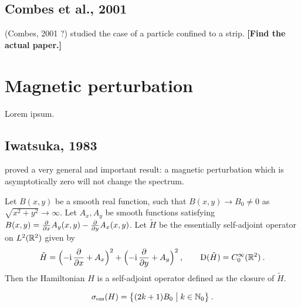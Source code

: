 \subsection{Combes et al., 2001}
(Combes, 2001 ?) studied the case of a particle confined to a strip.
\textbf{[Find the actual paper.]}

\section{Magnetic perturbation}
\label{section-known-magnetic}
Lorem ipsum.

\subsection{Iwatsuka, 1983}
\cite{Iwatsuka1983} proved a very general and important result: a magnetic perturbation which is asymptotically zero will not change the spectrum.
\begin{defn}
    Let $B(x, y)$ be a smooth real function, such that $B(x, y) \to B_0 \neq 0$ as $\sqrt{x^2 + y^2} \to \infty$. Let $A_x, A_y$ be smooth functions satisfying $B(x,y) = \frac{\partial }{\partial x} A_y(x,y) - \frac{\partial }{\partial y} A_x(x,y)$. Let $\tilde H$ be the essentially self-adjoint operator on $L^2(\mathbb{R}^2)$ given by
    \begin{gather*}
        \tilde H
        = \Big( {-\mathrm{i}} \, \frac{\partial }{\partial x} + A_x \Big)^2
        + \Big( {-\mathrm{i}} \, \frac{\partial }{\partial y} + A_y \Big)^2
        \: , \qquad
        \mathrm{D}(\tilde H) = C_0^\infty(\mathbb{R}^2)
        \: .
    \end{gather*}
    Then the Hamiltonian $H$ is a self-adjoint operator defined as the closure of $\tilde H$.
\end{defn}
\begin{thm}[Spectrum of $H$] \label{thm-Iwatsuka-unperturb}
    $$
        \sigma_{\mathrm{ess}}(H) = \big\{ (2k + 1) B_0  \;\big|\; k \in \mathbb{N}_0 \big\}
        \: .
    $$
\end{thm}

